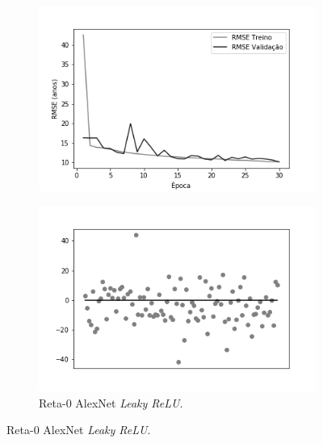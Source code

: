 \begin{figure}[hb!]
\begin{subfigure}[hb]{0.5\linewidth}
		\label{fig:histalexlrelunorm}
    \centering
		\includegraphics[width=\linewidth]{img/graficos-fase2/fig-history-alexnet-lrelu-data-augmentation-2-2.png}
	\end{subfigure}
  \begin{subfigure}[hb]{0.5\linewidth}
    \caption{Reta-0 AlexNet \emph{Leaky ReLU}.}
    \label{fig:redeneuralbiologica}
    \includegraphics[width=\linewidth]{img/graficos-fase2/fig-reta-0-alexnet-lrelu-data-augmentation-2-2.png}
  \end{subfigure}%
\end{figure}


